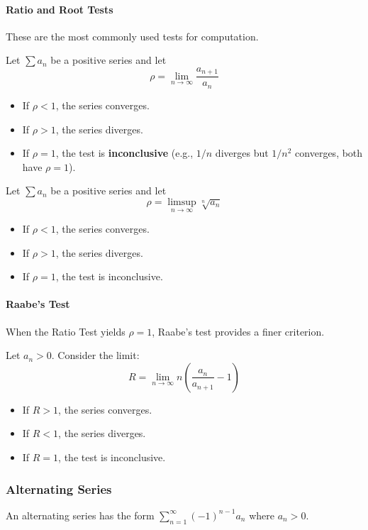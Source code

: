 \documentclass[oneside]{book}
\begin{document}
\paragraph{Ratio and Root Tests}
These are the most commonly used tests for computation.

\begin{theorem}
Let $\sum a_n$ be a positive series and let
\[ \rho = \lim_{n \to \infty} \frac{a_{n+1}}{a_n} \]
\begin{itemize}
    \item If $\rho < 1$, the series converges.
    \item If $\rho > 1$, the series diverges.
    \item If $\rho = 1$, the test is \textbf{inconclusive} (e.g., $1/n$ diverges but $1/n^2$ converges, both have $\rho=1$).
\end{itemize}
\end{theorem}

\begin{theorem}
Let $\sum a_n$ be a positive series and let
\[ \rho = \limsup_{n \to \infty} \sqrt[n]{a_n} \]
\begin{itemize}
    \item If $\rho < 1$, the series converges.
    \item If $\rho > 1$, the series diverges.
    \item If $\rho = 1$, the test is inconclusive.
\end{itemize}
\end{theorem}

\paragraph{Raabe's Test}
When the Ratio Test yields $\rho = 1$, Raabe's test provides a finer criterion.

\begin{theorem}
Let $a_n > 0$. Consider the limit:
\[ R = \lim_{n \to \infty} n \left( \frac{a_n}{a_{n+1}} - 1 \right) \]
\begin{itemize}
    \item If $R > 1$, the series converges.
    \item If $R < 1$, the series diverges.
    \item If $R = 1$, the test is inconclusive.
\end{itemize}
\end{theorem}

\subsubsection{Alternating Series}
An alternating series has the form $\sum_{n=1}^{\infty} (-1)^{n-1} a_n$ where $a_n > 0$.
\end{document}
